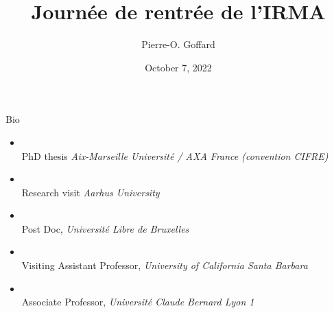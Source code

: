 \documentclass{beamer}
\title[BLOCKASTICS]{Journée de rentrée de l'IRMA}
\author{Pierre-O. Goffard}
\institute[UNISTRA]{Université de Strasbourg\\
 \texttt{goffard@unistra.fr}
}
\date{October 7, 2022}
\begin{document}
\begin{frame}
  \titlepage
\end{frame}
\begin{frame}{Bio}
\hspace{1cm}
\begin{itemize}
\item[] \\
\color{black} PhD thesis \textit{Aix-Marseille Université /  AXA France (convention CIFRE)}
\item[] \\
\color{black} Research visit \textit{Aarhus University}
\item[]\\
\color{black}  Post Doc, \textit{Université Libre de Bruxelles}
\item[]\\
\color{black}  Visiting Assistant Professor, \textit{University of California Santa Barbara}
\item[]\\
\color{black}  Associate Professor, \textit{Université Claude Bernard Lyon 1}
\end{itemize}
\end{frame}
\begin{frame}
  \tableofcontents
\end{frame}

\end{document}
